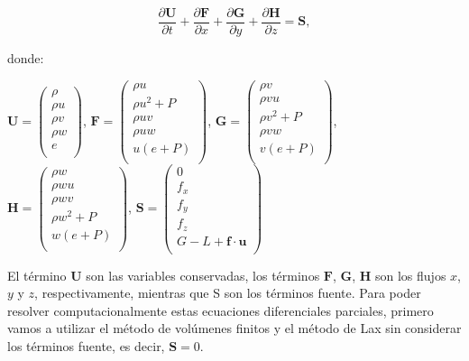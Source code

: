 \documentclass[12pt,a4paper]{book}
\begin{document}
\begin{equation} \label{euler_cartesianas}
\dfrac{\partial \mathbf{U}}{\partial t}+\dfrac{\partial \mathbf{F}}{\partial x}+\dfrac{\partial \mathbf{G}}{\partial y}+\dfrac{\partial \mathbf{H}}{\partial z}= \mathbf{S}  ,
\end{equation}

\noindent donde:
\begin{center}


$\mathbf{U}=
\left(\begin{smallmatrix}
\rho \\
\rho u \\
\rho v \\
\rho w \\
e \\
\end{smallmatrix}\right)
$,
$\mathbf{F} =
\left(\begin{smallmatrix}
\rho u \\
\rho u^{2}+P \\
\rho uv \\
\rho uw \\
u(e+P) \\
\end{smallmatrix}\right)
$,
$\mathbf{G} =
\left(\begin{smallmatrix}
\rho v\\
\rho vu \\
\rho v^{2}+P \\
\rho vw \\
v(e+P) \\
\end{smallmatrix}\right)
$,
$\mathbf{H} =
\left(\begin{smallmatrix}
\rho w\\
\rho wu \\
\rho wv \\
\rho w^{2}+P \\
w(e+P) \\
\end{smallmatrix}\right)
$, 
$\mathbf{S} =
\left(\begin{smallmatrix}
0 \\
f_{x} \\
f_{y} \\
f_{z} \\
G-L+\textbf{f} \cdot \textbf{u} \\
\end{smallmatrix}\right)
$
\end{center}

El término $\mathbf{U}$ son las variables conservadas, los términos $\mathbf{F}$, $\mathbf{G}$, $\mathbf{H}$ son los flujos $x$, $y$ y $z$, respectivamente, mientras que S son los términos fuente. 
Para poder resolver computacionalmente estas ecuaciones diferenciales parciales, primero vamos a utilizar el método de volúmenes finitos y el método de Lax sin considerar los términos fuente, es decir, 
$\mathbf{S}=0$.
\end{document}
